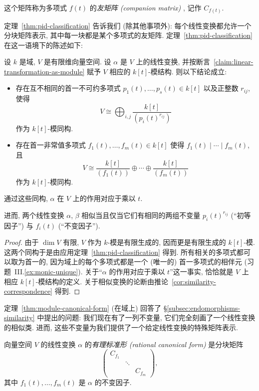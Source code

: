 \begin{definition}\label{def:companion-matrix}
这个矩阵称为多项式 $f(t)$ 的\emph{友矩阵 (companion matrix)}
, 记作 $C_{f(t)}$.
\end{definition}

定理~\ref{thm:pid-classification} 告诉我们 (除其他事项外): 每个线性变换都允许一个分块矩阵表示, 其中每一块都是某个多项式的友矩阵. 定理~\ref{thm:pid-classification} 在这一语境下的陈述如下:

\begin{theorem}\label{thm:module-canonical-form}
设 $k$ 是域, $V$ 是有限维向量空间. 设 $\alpha$ 是 $V$ 上的线性变换, 并按断言~\ref{claim:linear-transformation-as-module} 赋予 $V$ 相应的 $k[t]$-模结构. 则以下结论成立:
\begin{itemize}
	\item 存在互不相同的首一不可约多项式 $p_1(t),\ldots,p_s(t)\in k[t]$ 以及正整数 $r_{ij}$, 使得
	\[
	V\cong\bigoplus_{i,j}\frac{k[t]}{(p_i(t)^{r_{ij}})}
	\]
	作为 $k[t]$-模同构.
	\item 存在首一非常值多项式 $f_1(t),\ldots,f_m(t)\in k[t]$ 使得 $f_1(t)\mid\cdots\mid f_m(t)$, 且
	\[
	V\cong\frac{k[t]}{(f_1(t))}\oplus\cdots\oplus\frac{k[t]}{(f_m(t))}
	\]
	作为 $k[t]$-模同构.
\end{itemize}
通过这些同构, $\alpha$ 在 $V$ 上的作用对应于乘以 $t$.

进而, 两个线性变换 $\alpha$, $\beta$ 相似当且仅当它们有相同的两组不变量 $p_i(t)^{r_{ij}}$ (``初等因子'') 与 $f_i(t)$ (``不变因子'').
\end{theorem}

\begin{proof}
由于 $\dim V$ 有限, $V$ 作为 $k$-模是有限生成的, 因而更是有限生成的 $k[t]$-模. 这两个同构于是由应用定理~\ref{thm:pid-classification} 得到. 所有相关的多项式都可以取为首一的, 因为域上的每个多项式都是一个 (唯一的) 首一多项式的相伴元 (习题~III.\ref{ex:monic-unique}). 关于``$\alpha$ 的作用对应于乘以 $t$''这一事实, 恰恰就是 $V$ 上相应 $k[t]$-模结构的定义. 关于相似变换的论断由推论~\ref{cor:similarity-correspondence} 得到.
\end{proof}

定理~\ref{thm:module-canonical-form} (在域上) 回答了 §\ref{subsec:endomorphisms-similarity} 中提出的问题: 我们现在有了一列不变量, 它们完全刻画了一个线性变换的相似类. 进而, 这些不变量为我们提供了一个给定线性变换的特殊矩阵表示.

\begin{definition}\label{def:rational-canonical-form}
向量空间 $V$ 的线性变换 $\alpha$ 的\emph{有理标准形 (rational canonical form)}
是分块矩阵
\[
\begin{pmatrix}
C_{f_1}&&\\
&\ddots&\\
&&C_{f_m}
\end{pmatrix},
\]
其中 $f_1(t),\ldots,f_m(t)$ 是 $\alpha$ 的不变因子.
\end{definition}


